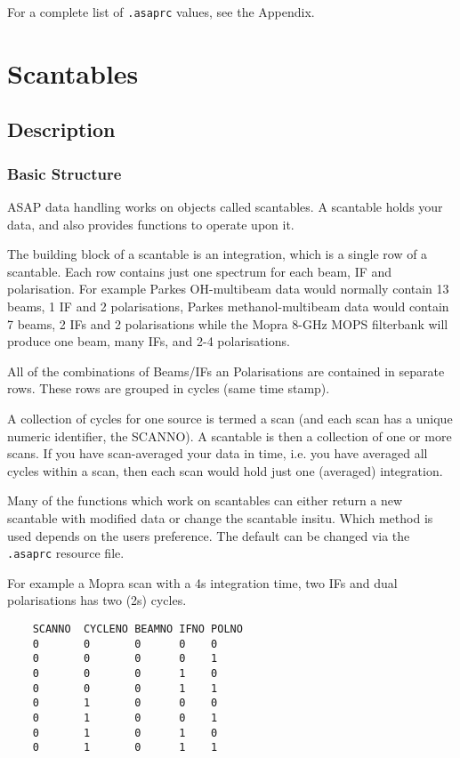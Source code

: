 \documentclass[11pt]{article}
\newcommand{\cmd}[1]{{\tt #1}}
\begin{document}
For a complete list of \cmd{.asaprc} values, see the Appendix.

\section{Scantables}
\subsection {Description}

\subsubsection {Basic Structure}

ASAP data handling works on objects called
scantables.  A scantable holds your data, and also provides functions
to operate upon it.

The building block of a scantable is an integration, which is a single
row of a scantable. Each row contains just one spectrum for each beam,
IF and polarisation. For example Parkes OH-multibeam data would
normally contain 13 beams, 1 IF and 2 polarisations, Parkes
methanol-multibeam data would contain 7 beams, 2 IFs and 2
polarisations while the Mopra 8-GHz MOPS filterbank will produce one
beam, many IFs, and 2-4 polarisations.

All of the combinations of Beams/IFs an Polarisations are
contained in separate rows. These rows are grouped in cycles (same time stamp).

A collection of cycles for one source is termed a scan (and each scan
has a unique numeric identifier, the SCANNO). A scantable is then a
collection of one or more scans. If you have scan-averaged your data
in time, i.e. you have averaged all cycles within a scan, then each
scan would hold just one (averaged) integration.

Many of the functions which work on scantables can either return a new
scantable with modified data or change the scantable insitu. Which
method is used depends on the users preference. The default can be
changed via the {\tt .asaprc} resource file.

For example a Mopra scan with a  4s integration time, two IFs and
dual polarisations has two (2s) cycles.
\begin{verbatim}
    SCANNO  CYCLENO BEAMNO IFNO POLNO
    0       0       0      0    0
    0       0       0      0    1
    0       0       0      1    0
    0       0       0      1    1
    0       1       0      0    0
    0       1       0      0    1
    0       1       0      1    0
    0       1       0      1    1
\end{verbatim}
\end{document}
